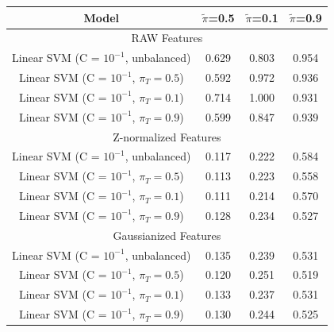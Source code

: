 \documentclass[12pt,a4paper]{article}
\begin{document}
\begin{center}
    \renewcommand{\arraystretch}{1.2}
    \begin{tabular}{@{}cccc@{}}
        Model                                        & \(\tilde{\pi}\)=0.5   & \(\tilde{\pi}\)=0.1  & \(\tilde{\pi}\)=0.9  \\ [0.5ex]

        \hline
        \multicolumn{4}{c}{RAW Features}                                                                                   \\
        \hline
        Linear SVM (C = $10^{-1}$, unbalanced)       & 0.629                 & 0.803                & 0.954                \\
        Linear SVM (C = $10^{-1}$, $\pi_T = 0.5$)    & 0.592                 & 0.972                & 0.936                \\
        Linear SVM (C = $10^{-1}$, $\pi_T = 0.1$)    & 0.714                 & 1.000                & 0.931                \\
        Linear SVM (C = $10^{-1}$, $\pi_T = 0.9$)    & 0.599                 & 0.847                & 0.939                \\

        \hline
        \multicolumn{4}{c}{Z-normalized Features}                                                                          \\
        \hline
        Linear SVM (C = $10^{-1}$, unbalanced)       & 0.117                 & 0.222                & 0.584                \\
        Linear SVM (C = $10^{-1}$, $\pi_T = 0.5$)    & {\color{blue} 0.113 } & 0.223                & 0.558                \\
        Linear SVM (C = $10^{-1}$, $\pi_T = 0.1$)    & {\color{red} 0.111 }  & {\color{red} 0.214 } & 0.570                \\
        Linear SVM (C = $10^{-1}$, $\pi_T = 0.9$)    & 0.128                 & 0.234                & 0.527                \\

        \hline
        \multicolumn{4}{c}{Gaussianized Features}                                                                          \\
        \hline
        Linear SVM (C = $10^{-1}$, unbalanced)       & 0.135                 & 0.239                & 0.531                \\
        Linear SVM (C = $10^{-1}$, $\pi_T = 0.5$)    & 0.120                 & 0.251                & {\color{red} 0.519 } \\
        Linear SVM (C = $10^{-1}$, $\pi_T = 0.1$)    & 0.133                 & 0.237                & 0.531                \\
        Linear SVM (C = $10^{-1}$, $\pi_T = 0.9$)    & 0.130                 & 0.244                & 0.525                \\


\end{tabular}
\end{center}
\end{document}
